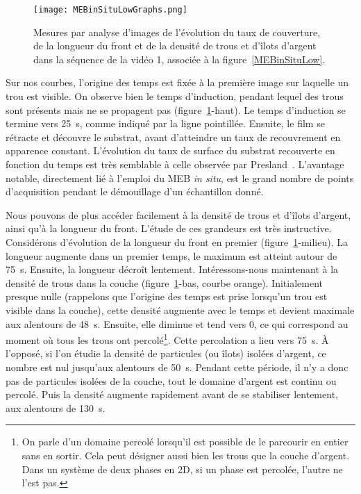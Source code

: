 \begin{figure}[!htb]
	\centering
	\texttt{[image: MEBinSituLowGraphs.png]}
	\caption{Mesures par analyse d'images de l'évolution du taux de couverture, de la longueur du front et de la densité de trous et d'îlots d'argent dans la séquence de la vidéo 1, associée à la figure~\ref{MEBinSituLow}.}
	\label{MEBinSituLowGraphs}
\end{figure}

Sur nos courbes, l'origine des temps est fixée à la première image sur laquelle un trou est visible. On observe bien le temps d'induction, pendant lequel des trous sont présents mais ne se propagent pas (figure~\ref{MEBinSituLowGraphs}-haut). Le temps d'induction se termine vers 25~s, comme indiqué par la ligne pointillée. Ensuite, le film se rétracte et découvre le substrat, avant d'atteindre un taux de recouvrement en apparence constant. L'évolution du taux de surface du substrat recouverte en fonction du temps est très semblable à celle observée par Presland~\cite{presland1972hillock}. L'avantage notable, directement lié à l'emploi du MEB\textit{ in situ}, est le grand nombre de points d'acquisition pendant le démouillage d'un échantillon donné.\par 
Nous pouvons de plus accéder facilement à la densité de trous et d'îlots d'argent, ainsi qu'à la longueur du front. L'étude de ces grandeurs est très instructive. Considérons d'évolution de la longueur du front en premier (figure~\ref{MEBinSituLowGraphs}-milieu). La longueur augmente dans un premier temps, le maximum est atteint autour de 75~s. Ensuite, la longueur décroît lentement. Intéressons-nous maintenant à la densité de trous dans la couche (figure~\ref{MEBinSituLowGraphs}-bas, courbe orange). Initialement presque nulle (rappelons que l'origine des temps est prise lorsqu'un trou est visible dans la couche), cette densité augmente avec le temps et devient maximale aux alentours de 48~s. Ensuite, elle diminue et tend vers 0, ce qui correspond au moment où tous les trous ont percolé\footnote{On parle d'un domaine percolé lorsqu'il est possible de le parcourir en entier sans en sortir. Cela peut désigner aussi bien les trous que la couche d'argent. Dans un système de deux phases en 2D, si un phase est percolée, l'autre ne l'est pas.}. Cette percolation a lieu vers 75~s. À l'opposé, si l'on étudie la densité de particules (ou îlots) isolées d'argent, ce nombre est nul jusqu'aux alentours de 50~s. Pendant cette période, il n'y a donc pas de particules isolées de la couche, tout le domaine d'argent est continu ou percolé. Puis la densité augmente rapidement avant de se stabiliser lentement, aux alentours de 130~s.\par
